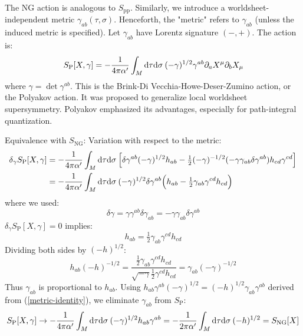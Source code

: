 The NG action is analogous to $S_{\mathrm{pp}}$. Similarly, we introduce a worldsheet-independent metric $\gamma_{ab}(\tau, \sigma)$. Henceforth, the "metric" refers to $\gamma_{ab}$ (unless the induced metric is specified). 
Let $\gamma_{ab}$ have Lorentz signature $(-,+)$. The action is: 
\begin{equation}
	S_{\mathrm{P}}[X,\gamma]=-\frac{1}{4\pi\alpha^\prime}\int_M \mathrm{d}\tau\mathrm{d}\sigma\: (-\gamma)^{1/2}\gamma^{ab}\partial_a X^\mu\partial_b X_\mu 
	\label{1.2.13}
\end{equation}
where $\gamma=\det\gamma^{ab}$. This is the Brink-Di Vecchia-Howe-Deser-Zumino action, or the Polyakov action. It was proposed to generalize local worldsheet supersymmetry. 
Polyakov emphasized its advantages, especially for path-integral quantization. 

Equivalence with $S_{\mathrm{NG}}$: Variation with respect to the metric: 
\begin{align}
	\delta_\gamma S_{\mathrm{P}}[X,\gamma] &= -\frac{1}{4\pi\alpha^\prime}\int_M \mathrm{d}\tau\mathrm{d}\sigma\: \Bigl[\delta\gamma^{ab}(-\gamma)^{1/2}h_{ab}-\tfrac{1}{2}(-\gamma)^{-1/2}(-\gamma \gamma_{ab}\delta\gamma^{ab})h_{cd}\gamma^{cd}\Bigr] \nonumber \\
	&= -\frac{1}{4\pi\alpha^\prime}\int_M \mathrm{d}\tau\mathrm{d}\sigma\: (-\gamma)^{1/2}\delta\gamma^{ab}\Bigl(h_{ab}-\tfrac{1}{2}\gamma_{ab}\gamma^{cd}h_{cd}\Bigr)
\end{align}
where we used: 
\begin{equation}
	\delta\gamma=\gamma \gamma^{ab}\delta\gamma_{ab}=-\gamma \gamma_{ab}\delta\gamma^{ab}
\end{equation}
$\delta_\gamma S_{\mathrm{P}}[X,\gamma]=0$ implies: 
\begin{equation}
	h_{ab}=\tfrac{1}{2}\gamma_{ab}\gamma^{cd}h_{cd}
\end{equation}
Dividing both sides by $(-h)^{1/2}$: 
\begin{equation}
	h_{ab}(-h)^{-1/2}=\frac{\frac{1}{2}\gamma_{ab}\gamma^{cd}h_{cd}}{\sqrt{-\gamma}\frac{1}{2}\gamma^{cd}h_{cd}}=\gamma_{ab}(-\gamma)^{-1/2} \label{metric-identity}
\end{equation}
Thus $\gamma_{ab}$ is proportional to $h_{ab}$. 
Using $h_{ab}\gamma^{ab}(-\gamma)^{1/2}=(-h)^{1/2}\gamma_{ab}\gamma^{ab}$ derived from (\ref{metric-identity}), we eliminate $\gamma_{ab}$ from $S_{\mathrm{P}}$: 
\begin{equation}
	S_{\mathrm{P}}[X,\gamma] \rightarrow -\frac{1}{4\pi\alpha^\prime}\int_M \mathrm{d}\tau\mathrm{d}\sigma\: (-\gamma)^{1/2}h_{ab}\gamma^{ab}
	=-\frac{1}{2\pi\alpha^\prime}\int_M \mathrm{d}\tau\mathrm{d}\sigma\: (-h)^{1/2}=S_{\mathrm{NG}}[X]
\end{equation}
